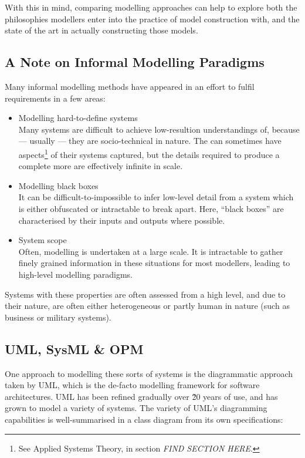 \documentclass[draft]{article}
\begin{document}
With this in mind, comparing modelling approaches can help to explore both the
philosophies modellers enter into the practice of model construction with, and
the state of the art in actually constructing those models.\par


\subsection{A Note on Informal Modelling Paradigms}
\label{subsec:informal_model_lit}
Many informal modelling methods have appeared in an effort to fulfil
requirements in a few areas:

\begin{itemize}
\item Modelling hard-to-define systems\\
  Many systems are difficult to achieve low-resultion understandings of, because
  --- usually --- they are socio-technical in nature. The can sometimes have
  aspects\footnote{See Applied Systems Theory, in section \emph{FIND SECTION
      HERE}.} of their
  systems captured, but the details required to produce a complete more are
  effectively infinite in scale.
\item Modelling black boxes\\
  It can be difficult-to-impossible to infer low-level detail from a system
  which is either obfuscated or intractable to break apart. Here, ``black
  boxes'' are characterised by their inputs and outputs where possible.
\item System scope\\
  Often, modelling is undertaken at a large scale. It is intractable to gather
  finely grained information in these situations for most modellers, leading to
  high-level modelling paradigms.
\end{itemize}

Systems with these properties are often assessed from a high level, and due to
their nature, are often either heterogeneous or partly human in nature (such as
business or military systems).\par

\subsection{UML, SysML \& OPM}
One approach to modelling these sorts of systems is the diagrammatic approach
taken by UML\cite{uml_citations}, which is the de-facto modelling framework for
software architectures. UML has been refined gradually over \~20 years of use,
and has grown to model a variety of systems. The variety of UML's diagramming
capabilities is well-summarised in a class diagram from its own
specifications:\par
\end{document}
